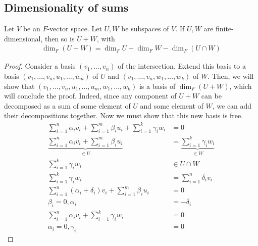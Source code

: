 \subsection{Dimensionality of sums}
\begin{proposition}
    Let $V$ be an $F$-vector space.
    Let $U, W$ be subspaces of $V$.
    If $U, W$ are finite-dimensional, then so is $U + W$, with
    \begin{align*}
        \dim_F (U + W) = \dim_F U + \dim_F W - \dim_F (U \cap W)
    \end{align*}
\end{proposition}
\begin{proof}
    Consider a basis $(v_1, \dots, v_n)$ of the intersection.
    Extend this basis to a basis $(v_1, \dots, v_n, u_1, \dots, u_m)$ of $U$ and $(v_1, \dots, v_n, w_1, \dots, w_k)$ of $W$.
    Then, we will show that $(v_1, \dots, v_n, u_1, \dots, u_m, w_1, \dots, w_k)$ is a basis of $\dim_F (U + W)$, which will conclude the proof.
    Indeed, since any component of $U + W$ can be decomposed as a sum of some element of $U$ and some element of $W$, we can add their decompositions together.
    Now we must show that this new basis is free.
    \begin{align*}
        \sum_{i=1}^n \alpha_i v_i + \sum_{i=1}^m \beta_i u_i + \sum_{i=1}^k \gamma_i w_i & = 0                                              \\
        \underbrace{\sum_{i=1}^n \alpha_i v_i + \sum_{i=1}^m \beta_i u_i}_{\in U}        & = \underbrace{\sum_{i=1}^k \gamma_i w_i}_{\in W} \\
        \sum_{i=1}^k \gamma_i w_i                                                        & \in U \cap W                                     \\
        \sum_{i=1}^k \gamma_i w_i                                                        & = \sum_{i=1}^n \delta_i v_i                      \\
        \sum_{i=1}^n (\alpha_i + \delta_i) v_i + \sum_{i=1}^m \beta_i u_i                & = 0                                              \\
        \beta_i = 0, \alpha_i                                                            & = -\delta_i                                      \\
        \sum_{i=1}^n \alpha_i v_i + \sum_{i=1}^k \gamma_i w_i                            & = 0                                              \\
        \alpha_i = 0, \gamma_i                                                           & = 0
    \end{align*}
\end{proof}
